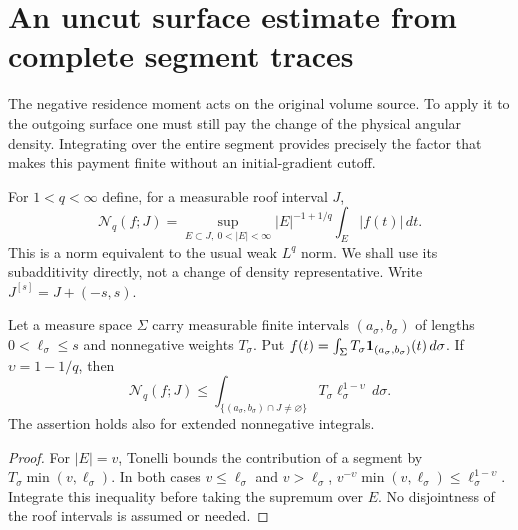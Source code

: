 \section{An uncut surface estimate from complete segment traces}
\label{sec:v88-surface}
The negative residence moment acts on the original volume source.
To apply it to the outgoing surface one must still pay the change
of the physical angular density. Integrating over the entire segment
provides precisely the factor that makes this payment finite without
an initial-gradient cutoff.

For $1<q<\infty$ define, for a measurable roof interval $J$,
\begin{equation}\label{eq:v88-weak-norm}
 \mathcal N_q(f;J)=\sup_{E\subset J,\ 0<|E|<\infty}
     |E|^{-1+1/q}\int_E|f(t)|\,dt.
\end{equation}
This is a norm equivalent to the usual weak $L^q$ norm. We shall
use its subadditivity directly, not a change of density representative.
Write $J^{[s]}=J+(-s,s)$.

\begin{lemma}
\label{lem:v88-pulse}
Let a measure space $\Sigma$ carry measurable finite intervals
$(a_\sigma,b_\sigma)$ of lengths $0<\ell_\sigma\le s$ and
nonnegative weights $T_\sigma$. Put
$f(t)=\int_\Sigma T_\sigma\mathbf1_{(a_\sigma,b_\sigma)}(t)\,d\sigma$.
If $\upsilon=1-1/q$, then
\begin{equation}\label{eq:v88-pulse}
 \mathcal N_q(f;J)\le
  \int_{\{(a_\sigma,b_\sigma)\cap J\ne\varnothing\}}
                         T_\sigma\ell_\sigma^{1-\upsilon}\,d\sigma.
\end{equation}
The assertion holds also for extended nonnegative integrals.
\end{lemma}
\begin{proof}
For $|E|=v$, Tonelli bounds the contribution of a segment by
$T_\sigma\min(v,\ell_\sigma)$. In both cases $v\le\ell_\sigma$
and $v>\ell_\sigma$,
$v^{-\upsilon}\min(v,\ell_\sigma)\le\ell_\sigma^{1-\upsilon}$.
Integrate this inequality before taking the supremum over $E$.
No disjointness of the roof intervals is assumed or needed.
\end{proof}

